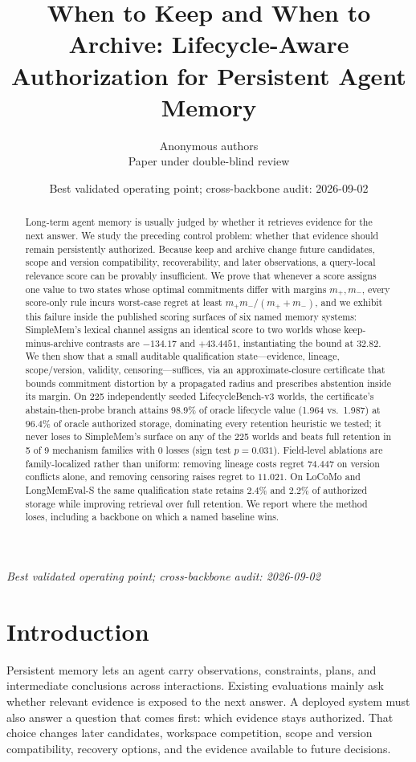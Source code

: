 \documentclass{article}
\title{When to Keep and When to Archive: Lifecycle-Aware Authorization for Persistent Agent Memory}
\author{Anonymous authors\\Paper under double-blind review}
\date{Best validated operating point; cross-backbone audit: 2026-09-02}
\begin{document}
\maketitle
\begin{center}\small\textit{Best validated operating point; cross-backbone audit: 2026-09-02}\end{center}

\begin{abstract}
Long-term agent memory is usually judged by whether it retrieves evidence for
the next answer. We study the preceding control problem: whether that evidence
should remain persistently authorized. Because keep and archive change future
candidates, scope and version compatibility, recoverability, and later
observations, a query-local relevance score can be provably insufficient. We
prove that whenever a score assigns one value to two states whose optimal
commitments differ with margins $m_+,m_-$, every score-only rule incurs
worst-case regret at least $m_+m_-/(m_++m_-)$, and we exhibit this failure
inside the published scoring surfaces of six named memory systems: SimpleMem's
lexical channel assigns an identical score to two worlds whose keep-minus-archive
contrasts are $-134.17$ and $+43.4451$, instantiating the bound at $32.82$. We
then show that a small auditable qualification state---evidence, lineage,
scope/version, validity, censoring---suffices, via an approximate-closure
certificate that bounds commitment distortion by a propagated radius and
prescribes abstention inside its margin. On 225 independently seeded
LifecycleBench-v3 worlds, the certificate's abstain-then-probe branch attains
$98.9\%$ of oracle lifecycle value (1.964 vs.\ 1.987) at $96.4\%$ of oracle
authorized storage, dominating every retention heuristic we tested; it never
loses to SimpleMem's surface on any of the 225 worlds and beats full retention
in 5 of 9 mechanism families with 0 losses (sign test $p=0.031$). Field-level
ablations are family-localized rather than uniform: removing lineage costs
regret $74.447$ on version conflicts alone, and removing censoring raises
regret to $11.021$. On LoCoMo and LongMemEval-S the same qualification state
retains $2.4\%$ and $2.2\%$ of authorized storage while improving retrieval
over full retention. We report where the method loses, including a backbone on
which a named baseline wins.
\end{abstract}

\section{Introduction}
Persistent memory lets an agent carry observations, constraints, plans, and
intermediate conclusions across interactions. Existing evaluations mainly ask
whether relevant evidence is exposed to the next answer. A deployed system must
also answer a question that comes first: which evidence stays authorized. That
choice changes later candidates, workspace competition, scope and version
compatibility, recovery options, and the evidence available to future decisions.
\end{document}
